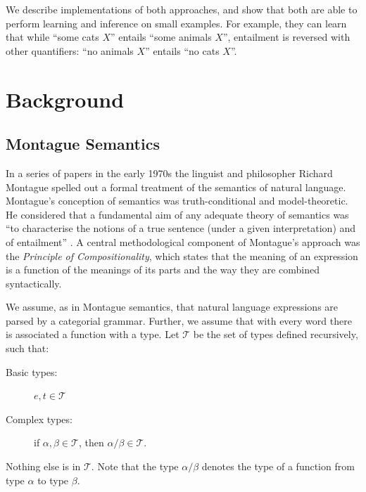 \documentclass[11pt]{article}
\theoremstyle{definition}
\begin{document}
We describe implementations of both approaches, and show that both are
able to perform learning and inference on small examples. For example,
they can learn that while ``some cats $X$'' entails ``some animals
$X$'', entailment is reversed with other quantifiers: ``no animals
$X$'' entails ``no cats $X$''.




\section{Background}

\subsection{Montague Semantics}

In a series of papers in the early 1970s \cite{Montague1970a,Montague1970b,Montague1973} the linguist and philosopher Richard Montague spelled out a formal treatment of the semantics of natural language. Montague's conception of semantics was truth-conditional and model-theoretic. He considered that a fundamental aim of any adequate theory of semantics was ``to characterise the notions of a true sentence (under a given interpretation) and of entailment'' \cite{Montague1970b}. A central methodological component of Montague's approach was the {\em Principle of Compositionality\/}, which states that the meaning of an expression is a function of the meanings of its parts and the way they are combined syntactically.


We assume, as in Montague semantics, that natural language expressions
are parsed by a categorial grammar. Further, we assume that with every word there is
associated a function with a type. Let $\mathcal{T}$ be the set of types defined
recursively, such that:
\begin{description}
\item [Basic types:] $e,t\in \mathcal{T}$
\item[Complex types:]  if $\alpha, \beta\in \mathcal{T}$, then $\alpha/\beta\in \mathcal{T}$.
\end{description}
Nothing else is in $\mathcal{T}$. Note that the type $\alpha/\beta$ denotes the type of a function from type
$\alpha$ to type $\beta$.
\end{document}
